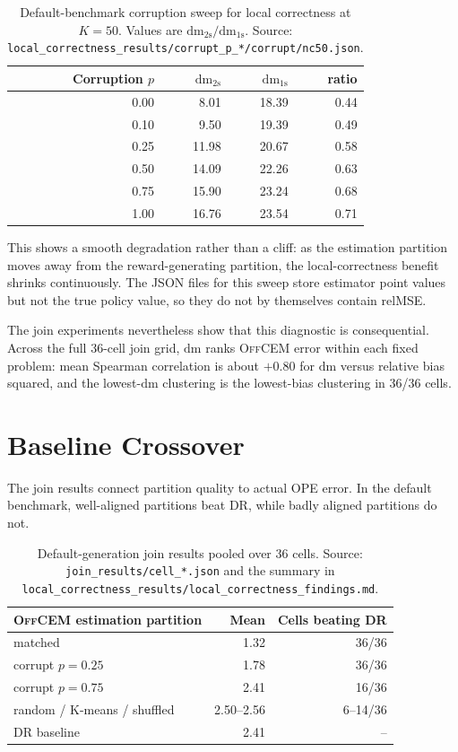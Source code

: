 \documentclass[11pt]{article}
\newcommand{\OffCEM}{\textsc{OffCEM}}
\newcommand{\DR}{\textsc{DR}}
\newcommand{\relMSE}{\mathrm{relMSE}}
\newcommand{\dm}{\mathrm{dm}}
\begin{document}
\begin{table}[h]
\centering
\caption{Default-benchmark corruption sweep for local correctness at $K=50$.
Values are $\dm_{\mathrm{2s}}/\dm_{\mathrm{1s}}$. Source:
\texttt{local_correctness_results/corrupt_p_*/corrupt/nc50.json}.}
\begin{tabular}{rrrr}
\toprule
Corruption $p$ & $\dm_{\mathrm{2s}}$ & $\dm_{\mathrm{1s}}$ & ratio \\
\midrule
0.00 & 8.01 & 18.39 & 0.44 \\
0.10 & 9.50 & 19.39 & 0.49 \\
0.25 & 11.98 & 20.67 & 0.58 \\
0.50 & 14.09 & 22.26 & 0.63 \\
0.75 & 15.90 & 23.24 & 0.68 \\
1.00 & 16.76 & 23.54 & 0.71 \\
\bottomrule
\end{tabular}
\end{table}

This shows a smooth degradation rather than a cliff: as the estimation partition
moves away from the reward-generating partition, the local-correctness benefit
shrinks continuously. The JSON files for this sweep store estimator point values
but not the true policy value, so they do not by themselves contain relMSE.

The join experiments nevertheless show that this diagnostic is consequential.
Across the full 36-cell join grid, $\dm$ ranks \OffCEM{} error within each fixed
problem: mean Spearman correlation is about $+0.80$ for $\dm$ versus relative
bias squared, and the lowest-$\dm$ clustering is the lowest-bias clustering in
36/36 cells.

\section{Baseline Crossover}

The join results connect partition quality to actual OPE error. In the default
benchmark, well-aligned partitions beat \DR{}, while badly aligned partitions do
not.

\begin{table}[h]
\centering
\caption{Default-generation join results pooled over 36 cells. Source:
\texttt{join_results/cell_*.json} and the summary in
\texttt{local_correctness_results/local_correctness_findings.md}.}
\begin{tabular}{lrr}
\toprule
\OffCEM{} estimation partition & Mean \relMSE{} & Cells beating \DR{} \\
\midrule
matched & 1.32 & 36/36 \\
corrupt $p=0.25$ & 1.78 & 36/36 \\
corrupt $p=0.75$ & 2.41 & 16/36 \\
random / K-means / shuffled & 2.50--2.56 & 6--14/36 \\
\DR{} baseline & 2.41 & -- \\
\bottomrule
\end{tabular}
\end{table}
\end{document}
